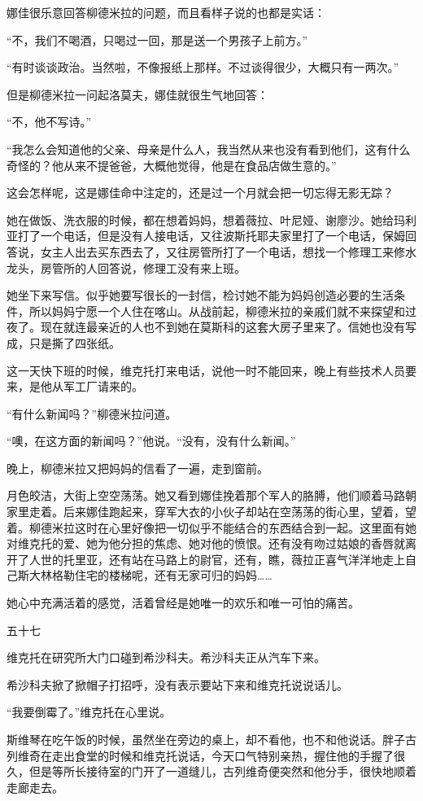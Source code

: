 娜佳很乐意回答柳德米拉的问题，而且看样子说的也都是实话：

“不，我们不喝酒，只喝过一回，那是送一个男孩子上前方。”

“有时谈谈政治。当然啦，不像报纸上那样。不过谈得很少，大概只有一两次。”

但是柳德米拉一问起洛莫夫，娜佳就很生气地回答：

“不，他不写诗。”

“我怎么会知道他的父亲、母亲是什么人，我当然从来也没有看到他们，这有什么奇怪的？他从来不提爸爸，大概他觉得，他是在食品店做生意的。”

这会怎样呢，这是娜佳命中注定的，还是过一个月就会把一切忘得无影无踪？

她在做饭、洗衣服的时候，都在想着妈妈，想着薇拉、叶尼娅、谢廖沙。她给玛利亚打了一个电话，但是没有人接电话，又往波斯托耶夫家里打了一个电话，保姆回答说，女主人出去买东西去了，又往房管所打了一个电话，想找一个修理工来修水龙头，房管所的人回答说，修理工没有来上班。

她坐下来写信。似乎她要写很长的一封信，检讨她不能为妈妈创造必要的生活条件，所以妈妈宁愿一个人住在喀山。从战前起，柳德米拉的亲戚们就不来探望和过夜了。现在就连最亲近的人也不到她在莫斯科的这套大房子里来了。信她也没有写成，只是撕了四张纸。

这一天快下班的时候，维克托打来电话，说他一时不能回来，晚上有些技术人员要来，是他从军工厂请来的。

“有什么新闻吗？”柳德米拉问道。

“噢，在这方面的新闻吗？”他说。“没有，没有什么新闻。”

晚上，柳德米拉又把妈妈的信看了一遍，走到窗前。

月色皎洁，大街上空空荡荡。她又看到娜佳挽着那个军人的胳膊，他们顺着马路朝家里走着。后来娜佳跑起来，穿军大衣的小伙子却站在空荡荡的街心里，望着，望着。柳德米拉这时在心里好像把一切似乎不能结合的东西结合到一起。这里面有她对维克托的爱、她为他分担的焦虑、她对他的愤恨。还有没有吻过姑娘的香唇就离开了人世的托里亚，还有站在马路上的尉官，还有，瞧，薇拉正喜气洋洋地走上自己斯大林格勒住宅的楼梯呢，还有无家可归的妈妈……

她心中充满活着的感觉，活着曾经是她唯一的欢乐和唯一可怕的痛苦。

五十七

维克托在研究所大门口碰到希沙科夫。希沙科夫正从汽车下来。

希沙科夫掀了掀帽子打招呼，没有表示要站下来和维克托说说话儿。

“我要倒霉了。”维克托在心里说。

斯维琴在吃午饭的时候，虽然坐在旁边的桌上，却不看他，也不和他说话。胖子古列维奇在走出食堂的时候和维克托说话，今天口气特别亲热，握住他的手握了很久，但是等所长接待室的门开了一道缝儿，古列维奇便突然和他分手，很快地顺着走廊走去。

